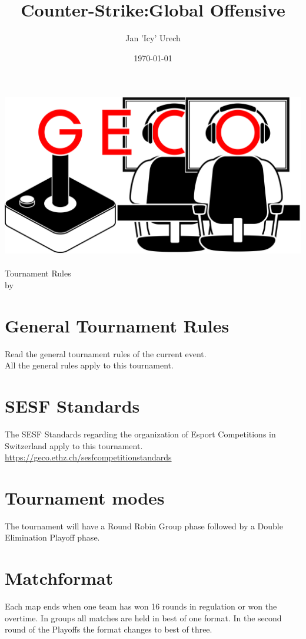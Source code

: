\documentclass{article}
\title{Counter-Strike:Global Offensive}
\author{Jan 'Icy' Urech }
\date{\today}
\begin{document}
\makeatletter
\begin{titlepage}
\centering
\includegraphics[scale=0.075]{GECo.png}\\
\LARGE \@title\\ Tournament Rules\\ \normalsize by \@author\\ \@date
\end{titlepage}
\makeatother


\clearpage

\tableofcontents
\clearpage

\section{General Tournament Rules}
Read the general tournament rules of the current event.\\
All the general rules apply to this tournament.

\section{SESF Standards}
The SESF Standards regarding the organization of Esport Competitions in Switzerland apply to this tournament. \url{https://geco.ethz.ch/sesfcompetitionstandards}

\section{Tournament modes}
The tournament will have a Round Robin Group phase followed by a Double Elimination Playoff phase.

\section{Matchformat}
Each map ends when one team has won 16 rounds in regulation or won the overtime.
In groups all matches are held in best of one format. In the second round of the Playoffs the format changes to best of three.
\end{document}
